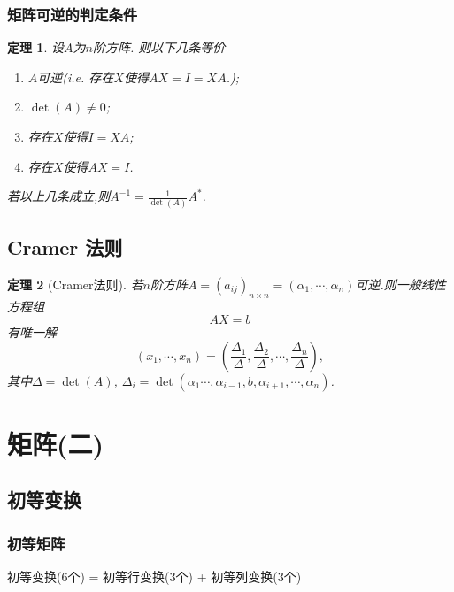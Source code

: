 \documentclass{article}
\newtheorem{theorem}{定理}  %
\renewcommand{\blue }[1]{{\textcolor[rgb]{0,0,1}{#1}}}
\begin{document}
\subsubsection{矩阵可逆的判定条件}
\begin{theorem}
设$A$为$n$阶方阵. 则以下几条等价
\begin{enumerate}
\item $A$可逆(i.e. 存在$X$使得$AX=I=XA$.);
\item $\det(A)\neq0$;
\item 存在$X$使得$I=XA$;
\item 存在$X$使得$AX=I$.
\end{enumerate}
若以上几条成立,则$A^{-1}=\frac1{\det(A)}A^*$.
\end{theorem}


\subsection{Cramer 法则}
\begin{theorem}[Cramer法则] \small
若$n$阶方阵$A=(a_{ij})_{n\times n}=(\alpha_1,\cdots,\alpha_n)$可逆.则一般线性方程组
\[AX=b\]
有唯一解
\[(x_1,\cdots,x_n)=\left(\frac{\Delta_1}{\Delta},\frac{\Delta_2}{\Delta},\cdots,\frac{\Delta_n}{\Delta}\right),\]
其中$\Delta=\det(A)$, $\Delta_i=\det(\alpha_1\cdots,\alpha_{i-1},b,\alpha_{i+1},\cdots,\alpha_n)$.
\end{theorem}
\newpage




\section{矩阵(二)}


\subsection{初等变换}

\subsubsection{初等矩阵}
\blue{初等变换}(6个) = \blue{初等行变换}(3个) + \blue{初等列变换}(3个)
\end{document}
